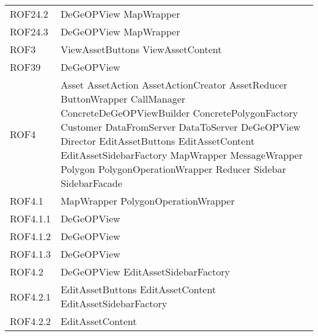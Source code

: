 \begin{longtable}{p{2.5cm}!{\VRule[1pt]}p{5cm}}
		ROF24.2 & DeGeOPView \newline MapWrapper\\
		ROF24.3 & DeGeOPView \newline MapWrapper\\
		ROF3 & ViewAssetButtons \newline ViewAssetContent\\
		ROF39 & DeGeOPView\\
		ROF4 & Asset \newline AssetAction \newline AssetActionCreator \newline AssetReducer \newline ButtonWrapper \newline CallManager \newline ConcreteDeGeOPViewBuilder \newline ConcretePolygonFactory \newline Customer \newline DataFromServer \newline DataToServer \newline DeGeOPView \newline Director \newline EditAssetButtons \newline EditAssetContent \newline EditAssetSidebarFactory \newline MapWrapper \newline MessageWrapper \newline Polygon \newline PolygonOperationWrapper \newline Reducer \newline Sidebar \newline SidebarFacade\\
		ROF4.1 & MapWrapper \newline PolygonOperationWrapper\\
		ROF4.1.1 & DeGeOPView\\
		ROF4.1.2 & DeGeOPView\\
		ROF4.1.3 & DeGeOPView\\
		ROF4.2 & DeGeOPView \newline EditAssetSidebarFactory\\
		ROF4.2.1 & EditAssetButtons \newline EditAssetContent \newline EditAssetSidebarFactory\\
		ROF4.2.2 & EditAssetContent\\

\end{longtable}
